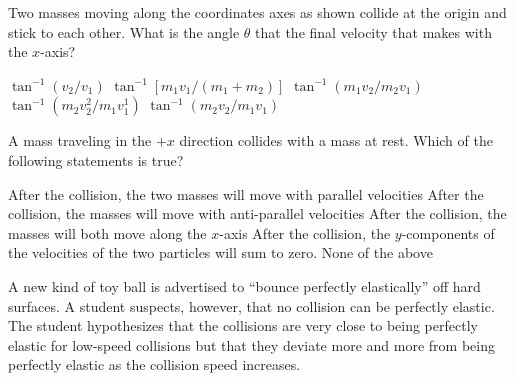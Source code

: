 \documentclass{../../../oss-ap12ibhl}
\begin{document}
\begin{questions}
  \question Two masses moving along the coordinates axes as shown collide at the
  origin and stick to each other. What is the angle $\theta$ that the final
  velocity that makes with the $x$-axis?
  
  \begin{minipage}{.4\linewidth}
  \end{minipage}
  \begin{minipage}{.5\linewidth}
    \begin{choices}
      \choice $\tan^{-1}(v_2/v_1)$
      \choice $\tan^{-1}[m_1v_1/(m_1+m_2)]$
      \choice $\tan^{-1}(m_1v_2/m_2v_1)$
      \choice $\tan^{-1}(m_2v_2^2/m_1v_1^1)$
      \choice $\tan^{-1}(m_2v_2/m_1v_1)$
    \end{choices}
  \end{minipage}

  \question A mass traveling in the $+x$ direction collides with a mass at rest.
  Which of the following statements is true?
  \begin{choices}
    \choice After the collision, the two masses will move with parallel
    velocities
    \choice After the collision, the masses will move with anti-parallel
    velocities
    \choice After the collision, the masses will both move along the $x$-axis
    \choice After the collision, the $y$-components of the velocities of the two
    particles will sum to zero.
    \choice None of the above
  \end{choices}
  \newpage

  \question A new kind of toy ball is advertised to ``bounce perfectly
  elastically'' off hard surfaces. A student suspects, however, that no
  collision can be perfectly elastic. The student hypothesizes that the
  collisions are very close to being perfectly elastic for low-speed collisions
  but that they deviate more and more from being perfectly elastic as the
  collision speed increases.
  \begin{parts}

\end{parts}
\end{questions}
\end{document}
